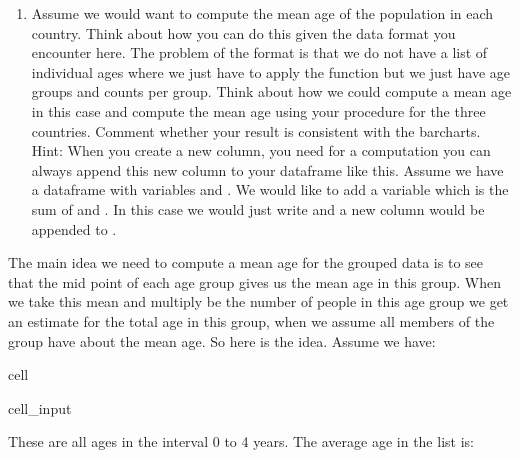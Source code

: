 \documentclass[letterpaper,10pt,english]{jupyterBook}
\begin{document}
\begin{enumerate}
%
\setcounter{enumi}{2}
\item {} 
\sphinxAtStartPar
Assume we would want to compute the mean age of the population in each country. Think about how you can do this given the data format you encounter here. The problem of the format is that we do not have a list of individual ages where we just have to apply the  function but we just have age groups and counts per group. Think about how we could compute a mean age in this case and compute the mean age using your procedure for the three countries. Comment whether your result is consistent with the barcharts. Hint: When you create a new column, you need for a computation you can always append this new column to your dataframe like this. Assume we have a dataframe with variables  and . We would like to add a variable  which is the sum of  and . In this case we would just write  and a new column  would be appended to .

\end{enumerate}

\sphinxAtStartPar
The main idea we need to compute a mean age for the grouped data is to see that the mid point of each age group gives us the mean age in this group. When we take this mean and multiply be the number of people in this age group we get an estimate for the total age in this group, when we assume all members of the group have about the mean
age. So here is the idea. Assume we have:

\begin{sphinxuseclass}{cell}\begin{sphinxVerbatimInput}

\begin{sphinxuseclass}{cell_input}
\begin{sphinxVerbatim}[commandchars=\\\{\}]
\end{sphinxVerbatim}

\end{sphinxuseclass}\end{sphinxVerbatimInput}

\end{sphinxuseclass}
\sphinxAtStartPar
These are all ages in the interval 0 to 4 years. The average age in the list is:
\end{document}

